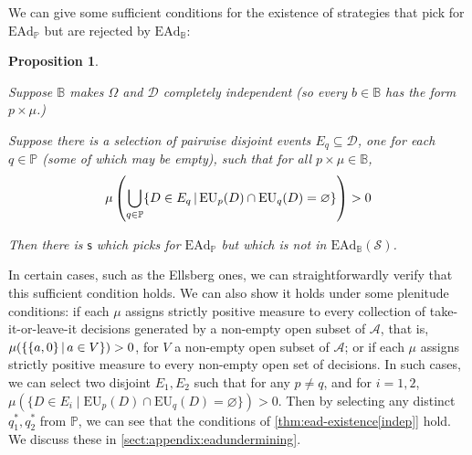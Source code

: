 \documentclass[a4paper]{article}
\newtheorem{proposition}[theorem]{Proposition}
\newcommand\A{\mathcal{A}}
\renewcommand\P{\mathbb{P}} %
\newcommand\EU{\mathrm{EU}}
\newcommand\EAd{\mathrm{EAd}}
\newcommand{\Decs}{\mathcal{D}}
\renewcommand\S{\mathcal{S}}
\newcommand\s{\mathsf{s}}
\newcommand{\IB}{\mathbb{B}}
\newcommand{\IP}{\P}
\renewcommand{\color}[1]{}
\newcommand\SetDelimiter[1][]{
	\nonscript\,#1\vert \allowbreak \nonscript\,\mathopen{}}
\providecommand\given{\SetDelimiter}
\renewcommand{\emptyset}{\varnothing}
\newenvironment{CCM rewritten}
{\begingroup\color{blue}} %
{\endgroup}              %
\begin{document}
We can give some sufficient conditions for the existence of strategies that pick for $\EAd_\IP$ but are rejected by $\EAd_\IB$: 
\begin{proposition}\label{thm:ead-existsimpermissible[indep]}

Suppose $\IB$ makes $\Omega$ and $\Decs$ completely independent (so every $b\in\IB$ has the form $p\times\mu$.)

Suppose there is a selection of pairwise disjoint events $E_q\subseteq\Decs$, one for each $q\in\IP$ (some of which may be empty), such that for all $p\times\mu\in\IB$, 
\[
\mu\left(\bigcup_{q\in\IP}\{D\in E_q\given \EU_p(D)\cap\EU_q(D)=\emptyset\}\right)>0
\]

Then there is $\s$ which picks for $\EAd_\IP$ but which is not in $\EAd_\IB(\S)$. 
\end{proposition}
In certain cases, such as the Ellsberg ones, we  can straightforwardly verify that this sufficient condition holds. 
We can also show it holds under some plenitude conditions: if each $\mu$ assigns strictly positive measure to every collection of take-it-or-leave-it decisions generated by a non-empty open subset of $\A$, that is, $\mu(\{\{a,0\}\given a\in V\})>0$, for $V$ a non-empty open subset of $\A$; or if each $\mu$ assigns strictly positive measure to every non-empty open set of decisions. In such cases, we can select two disjoint $E_1,E_2$ such that for any $p\neq q$, and for $i = 1, 2$, $\mu(\{D\in E_i \mid \EU_p(D)\cap \EU_q(D)=\emptyset\})>0$. Then by selecting any distinct $q^*_1,q^*_2$ from $\IP$, we can see that the conditions of \cref{thm:ead-existence[indep]} hold. We discuss these in \cref{sect:appendix:eadundermining}.



\end{document}
